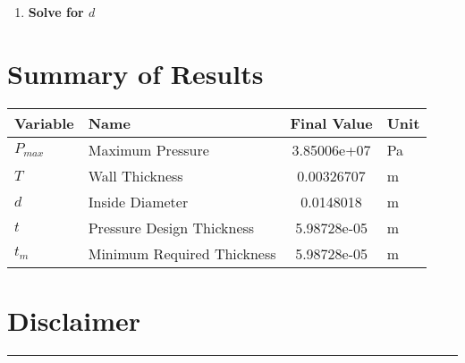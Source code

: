 \documentclass[11pt,a4paper]{article}
\begin{document}
\begin{enumerate}[label=\textbf{Step \arabic*:},leftmargin=2cm]
\item \textbf{Solve for $d$}


\end{enumerate}


\section{Summary of Results}

\begin{longtable}{llSl}
\toprule
Variable & Name & {Final Value} & Unit \\
\midrule
\endhead
$P_{max}$ & Maximum Pressure & 3.85006e+07 & Pa \\
$T$ & Wall Thickness & 0.00326707 & m \\
$d$ & Inside Diameter & 0.0148018 & m \\
$t$ & Pressure Design Thickness & 5.98728e-05 & m \\
$t_{m}$ & Minimum Required Thickness & 5.98728e-05 & m \\
\bottomrule
\end{longtable}


\clearpage

\section*{Disclaimer}

\begin{center}
\rule{\textwidth}{0.4pt}
\end{center}
\end{document}
